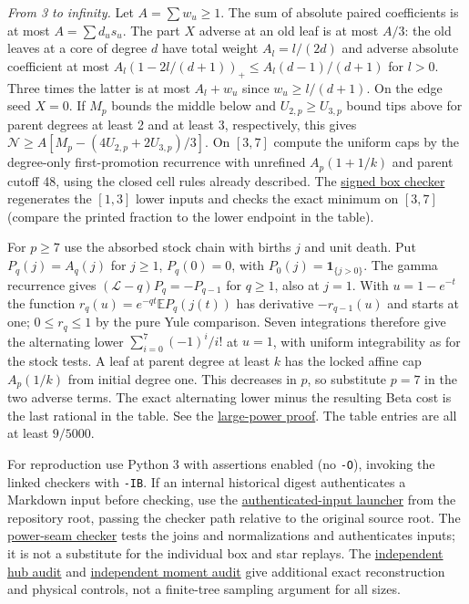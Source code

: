 \documentclass[11pt]{article}
\newcommand{\proofsrc}[2]{\href{https://github.com/uzay-eth/friend-tree-exponent/blob/a0972085ad72ad5685ae7b424988648d1965e73c/#1}{#2}}
\theoremstyle{remark}
\numberwithin{equation}{section}
\newcommand{\E}{\mathbb E}
\begin{document}
\emph{From 3 to infinity.} Let $A=\sum w_u\ge1$. The sum of absolute paired coefficients is at most $A=\sum d_us_u$. The part $X$ adverse at an old leaf is at most $A/3$: the old leaves at a core of degree $d$ have total weight $A_l=l/(2d)$ and adverse absolute coefficient at most $A_l(1-2l/(d+1))_+\le A_l(d-1)/(d+1)$ for $l>0$. Three times the latter is at most $A_l+w_u$ since $w_u\ge l/(d+1)$. On the edge seed $X=0$. If $M_p$ bounds the middle below and $U_{2,p}\ge U_{3,p}$ bound tips above for parent degrees at least 2 and at least 3, respectively, this gives $\mathcal N\ge A[M_p-(4U_{2,p}+2U_{3,p})/3]$. On $[3,7]$ compute the uniform caps by the degree-only first-promotion recurrence with unrefined $A_p(1+1/k)$ and parent cutoff 48, using the closed cell rules already described. The \proofsrc{round2/proofs/astra-late/source/round2/open/age-order/hub-ranking/mellin/check.py}{signed box checker} regenerates the $[1,3]$ lower inputs and checks the exact minimum on $[3,7]$ (compare the printed fraction to the lower endpoint in the table).

For $p\ge7$ use the absorbed stock chain with births $j$ and unit death. Put $P_q(j)=A_q(j)$ for $j\ge1$, $P_q(0)=0$, with $P_0(j)=\mathbf1_{\{j>0\}}$. The gamma recurrence gives $(\mathcal L-q)P_q=-P_{q-1}$ for $q\ge1$, also at $j=1$. With $u=1-e^{-t}$ the function $r_q(u)=e^{-qt}\E P_q(j(t))$ has derivative $-r_{q-1}(u)$ and starts at one; $0\le r_q\le1$ by the pure Yule comparison. Seven integrations therefore give the alternating lower $\sum_{i=0}^7(-1)^i/i!$ at $u=1$, with uniform integrability as for the stock tests. A leaf at parent degree at least $k$ has the locked affine cap $A_p(1/k)$ from initial degree one. This decreases in $p$, so substitute $p=7$ in the two adverse terms. The exact alternating lower minus the resulting Beta cost is the last rational in the table. See the \proofsrc{round2/proofs/astra-late/source/round2/open/age-order/hub-ranking/mellin/README.md}{large-power proof}. The table entries are all at least $9/5000$.

For reproduction use Python 3 with assertions enabled (no \texttt{-O}), invoking the linked checkers with \texttt{-IB}. If an internal historical digest authenticates a Markdown input before checking, use the \proofsrc{round2/verify/astra-late/with-originals.py}{authenticated-input launcher} from the repository root, passing the checker path relative to the original source root. The \proofsrc{round2/proofs/astra-late/source/round2/open/age-order/hub-ranking/all-powers/positive/check.py}{power-seam checker} tests the joins and normalizations and authenticates inputs; it is not a substitute for the individual box and star replays. The \proofsrc{round2/proofs/astra-late/independent/audit_claim26.py}{independent hub audit} and \proofsrc{round2/proofs/astra-late/independent/audit_claim27.py}{independent moment audit} give additional exact reconstruction and physical controls, not a finite-tree sampling argument for all sizes.
\end{document}
